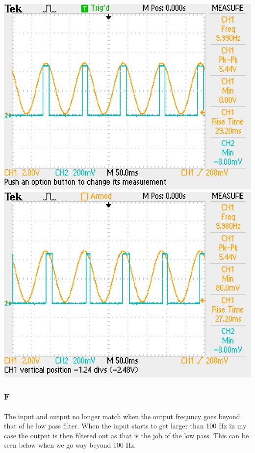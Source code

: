 \documentclass[12pt]{article}
\begin{document}
					\begin{center}
						\includegraphics[scale=0.5]{noserial.jpg}\\
						\vspace{1cm}
						\includegraphics[scale=0.5]{serial.jpg}\\
					\end{center}

			\subsubsection{F}
				\paragraph{}
					The input and output no longer match when the output frequncy goes beyond that of he low pass filter.  When the input starts to get larger than 100
					Hz in my case the output is then filtered out as that is the job of the low pass.  This can be seen below when we go way beyond 100 Hz.
\end{document}
